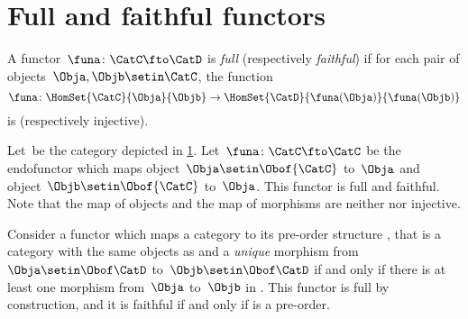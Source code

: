 
\section{Full and faithful functors}

\begin{ctdefinition}
    \label{def:functorfullfaith}
    A functor~$\funa\colon \CatC \fto \CatD$ is \emph{full} (respectively \emph{faithful}) if for each pair of objects~$\Obja,\Objb\setin \CatC$, the function
    \begin{equation}
        \funa \colon \HomSet{\CatC}{\Obja}{\Objb} \to \HomSet{\CatD}{\funa(\Obja)}{\funa(\Objb)}
    \end{equation}
    is  (respectively injective).
\end{ctdefinition}

\begin{example}
    Let~\CatC be the category depicted in \cref{fig:ex_full_faithful_1}.
    Let~$\funa\colon \CatC \fto \CatC$ be the endofunctor which maps object~$\Obja\setin \Obof{\CatC}$ to~$\Obja$ and object~$\Objb\setin \Obof{\CatC}$ to~$\Obja$.
    This functor is full and faithful.
    Note that the map of objects and the map of morphisms are neither  nor injective.

    \begin{figure}[h!]
        \centering
        \caption{}
        \label{fig:ex_full_faithful_1}
    \end{figure}
\end{example}

\begin{example}
    Consider a functor which maps a category \CatC to its pre-order structure \CatD, that is a category with the same objects as \CatC and a \emph{unique} morphism from~$\Obja\setin \Obof\CatD$ to~$\Objb\setin \Obof\CatD$ if and only if there is at least one morphism from~$\Obja$ to~$\Objb$ in \CatC.
    This functor is full by construction, and it is faithful if and only if \CatC is a pre-order.
\end{example}

